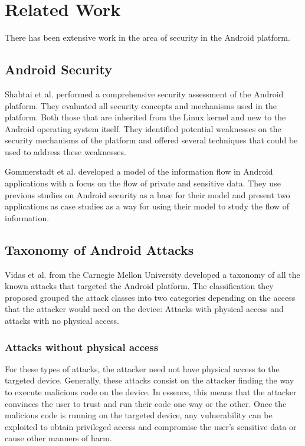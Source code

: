 \documentclass[conference]{IEEEtran}
\begin{document}
\section{Related Work}

There has been extensive work in the area of security in the Android platform. 

\subsection{Android Security}

Shabtai et al. \cite{shabtai_google_2010} performed a comprehensive security assessment of the Android platform. They evaluated all security concepts and mechanisms used in the platform. Both those that are inherited from the Linux kernel and new to the Android operating system itself. They identified potential weaknesses on the security mechanisms of the platform and offered several techniques that could be used to address these weaknesses. 

Gommerstadt et al. \cite{gommerstadt2012android} developed a model of the information flow in Android applications with a focus on the flow of private and sensitive data. They use previous studies on Android security as a base for their model and present two applications as case studies as a way for using their model to study the flow of information.

\subsection{Taxonomy of Android Attacks}

Vidas et al. \cite{vidas_all_2011} from the Carnegie Mellon University developed a taxonomy of all the known attacks that targeted the Android platform. The classification they proposed grouped the attack classes into two categories depending on the access that the attacker would need on the device: Attacks with physical access and attacks with no physical access.

\subsubsection{Attacks without physical access}

For these types of attacks, the attacker need not have physical access to the targeted device. Generally, these attacks consist on the attacker finding the way to execute malicious code on the device. In essence, this means that the attacker convinces the user to trust and run their code one way or the other. Once the malicious code is running on the targeted device, any vulnerability can be exploited to obtain privileged access and compromise the user's sensitive data or cause other manners of harm.
\end{document}
